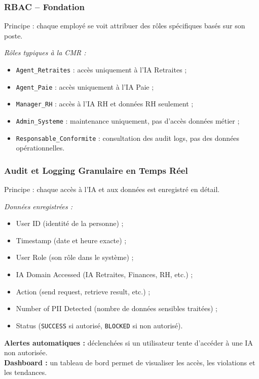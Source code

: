 \documentclass[12pt, a4paper]{report}
\begin{document}
\subsubsection{RBAC -- Fondation}

Principe : chaque employé se voit attribuer des rôles spécifiques basés
sur son poste.

\textit{Rôles typiques à la CMR :}
\begin{itemize}
  \item \texttt{Agent\_Retraites} : accès uniquement à l'IA Retraites ;
  \item \texttt{Agent\_Paie} : accès uniquement à l'IA Paie ;
  \item \texttt{Manager\_RH} : accès à l'IA RH et données RH seulement ;
  \item \texttt{Admin\_Systeme} : maintenance uniquement, pas d'accès
        données métier ;
  \item \texttt{Responsable\_Conformite} : consultation des audit logs,
        pas des données opérationnelles.
\end{itemize}

\subsubsection{Audit et Logging Granulaire en Temps Réel}

Principe : chaque accès à l'IA et aux données est enregistré en détail.

\textit{Données enregistrées :}
\begin{itemize}
  \item User ID (identité de la personne) ;
  \item Timestamp (date et heure exacte) ;
  \item User Role (son rôle dans le système) ;
  \item IA Domain Accessed (IA Retraites, Finances, RH, etc.) ;
  \item Action (send request, retrieve result, etc.) ;
  \item Number of PII Detected (nombre de données sensibles traitées) ;
  \item Status (\texttt{SUCCESS} si autorisé, \texttt{BLOCKED} si non
        autorisé).
\end{itemize}

\textbf{Alertes automatiques :} déclenchées si un utilisateur tente
d'accéder à une IA non autorisée.\\
\textbf{Dashboard :} un tableau de bord permet de visualiser les accès,
les violations et les tendances.
\end{document}
